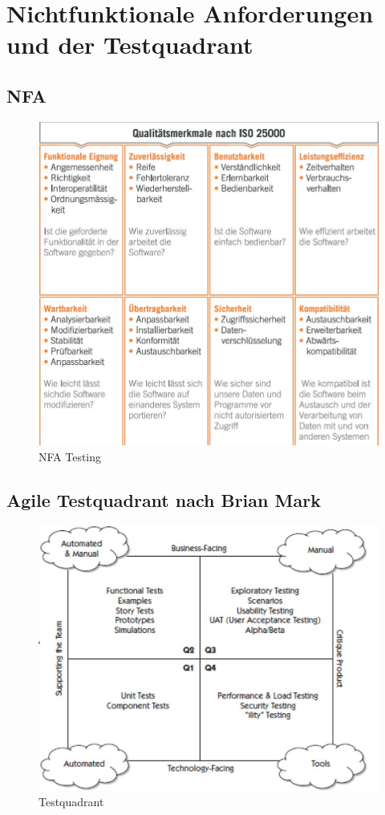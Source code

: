 
\section{Nichtfunktionale Anforderungen und der Testquadrant}

\subsection{NFA}

\begin{figure}[h!]
\centering
\includegraphics[width=0.7\linewidth]{fig/nfa-testing}
\caption{NFA Testing}
\label{fig:nfa-testing}
\end{figure}

\subsection{Agile Testquadrant nach Brian Mark}

\begin{figure}[h!]
\centering
\includegraphics[width=0.5\linewidth]{fig/testquadrant}
\caption{Testquadrant}
\label{fig:testquadrant}
\end{figure}


